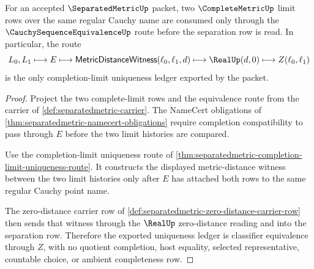 \begin{theorem}\label{thm:separatedmetric-limit-uniqueness-ledger}
For an accepted $\SeparatedMetricUp$ packet, two $\CompleteMetricUp$ limit rows over the same regular Cauchy name are consumed only through the $\CauchySequenceEquivalenceUp$ route before the separation row is read. In particular, the route
$$
L_0,L_1 \longmapsto E \longmapsto \mathsf{MetricDistanceWitness}(\ell_0,\ell_1,d) \longmapsto \RealUp(d,0) \longmapsto Z(\ell_0,\ell_1)
$$
is the only completion-limit uniqueness ledger exported by the packet.
\end{theorem}
\begin{proof}
Project the two complete-limit rows and the equivalence route from the carrier of \autoref{def:separatedmetric-carrier}. The NameCert obligations of \autoref{thm:separatedmetric-namecert-obligations} require completion compatibility to pass through $E$ before the two limit histories are compared.

Use the completion-limit uniqueness route of \autoref{thm:separatedmetric-completion-limit-uniqueness-route}. It constructs the displayed metric-distance witness between the two limit histories only after $E$ has attached both rows to the same regular Cauchy point name.

The zero-distance carrier row of \autoref{def:separatedmetric-zero-distance-carrier-row} then sends that witness through the $\RealUp$ zero-distance reading and into the separation row. Therefore the exported uniqueness ledger is classifier equivalence through $Z$, with no quotient completion, host equality, selected representative, countable choice, or ambient completeness row.
\end{proof}

